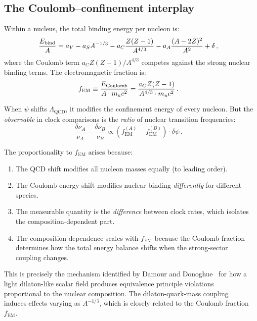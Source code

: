 \documentclass[aps,prd,twocolumn,superscriptaddress,floatfix,nofootinbib]{revtex4-2}
\newcommand{\LQCD}{\Lambda_{\mathrm{QCD}}}
\newcommand{\fEM}{f_{\mathrm{EM}}}
\begin{document}
\subsection{The Coulomb--confinement interplay}

Within a nucleus, the total binding energy per nucleon is:
\begin{equation}
\frac{E_{\rm bind}}{A} = a_V - a_S A^{-1/3} - a_C \frac{Z(Z-1)}{A^{4/3}} -
a_A \frac{(A-2Z)^2}{A^2} + \delta \, ,
\label{eq:semi_empirical}
\end{equation}
where the Coulomb term $a_C Z(Z-1)/A^{4/3}$ competes against the strong nuclear
binding terms. The electromagnetic fraction is:
\begin{equation}
\fEM \equiv \frac{E_{\rm Coulomb}}{A \cdot m_u c^2} = \frac{a_C Z(Z-1)}{A^{4/3}
\cdot m_u c^2} \, .
\end{equation}

When $\psi$ shifts $\LQCD$, it modifies the confinement energy of every nucleon.
But the \emph{observable} in clock comparisons is the \emph{ratio} of nuclear
transition frequencies:
\begin{equation}
\frac{\delta\nu_A}{\nu_A} - \frac{\delta\nu_B}{\nu_B} \propto \left( \fEM^{(A)}
- \fEM^{(B)} \right) \cdot \delta\psi \, .
\end{equation}

The proportionality to $\fEM$ arises because:
\begin{enumerate}
\item The QCD shift modifies all nucleon masses equally (to leading order).
\item The Coulomb energy shift modifies nuclear binding \emph{differently} for
different species.
\item The measurable quantity is the \emph{difference} between clock rates, which
isolates the composition-dependent part.
\item The composition dependence scales with $\fEM$ because the Coulomb fraction
determines how the total energy balance shifts when the strong-sector coupling
changes.
\end{enumerate}

This is precisely the mechanism identified by Damour and
Donoghue~\cite{Damour2010} for how a light dilaton-like scalar field produces
equivalence principle violations proportional to the nuclear composition. The
dilaton-quark-mass coupling induces effects varying as $A^{-1/3}$, which
is closely related to the Coulomb fraction $\fEM$.
\end{document}
